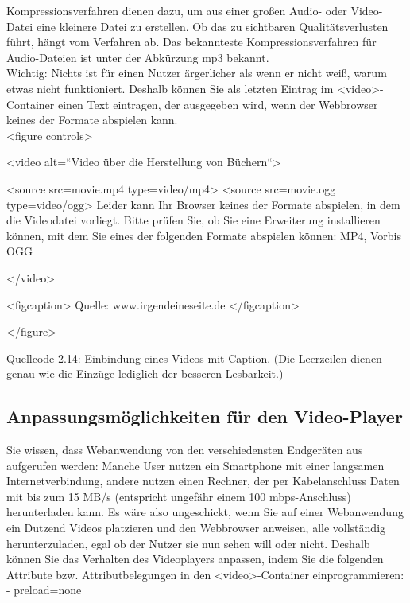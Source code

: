 Kompressionsverfahren dienen dazu, um aus einer großen Audio- oder Video-Datei eine kleinere Datei zu erstellen. Ob das zu sichtbaren Qualitätsverlusten führt, hängt vom Verfahren ab. Das bekannteste Kompressionsverfahren für Audio-Dateien ist unter der Abkürzung mp3 bekannt.\\

Wichtig: Nichts ist für einen Nutzer ärgerlicher als wenn er nicht weiß, warum etwas nicht funktioniert. Deshalb können Sie als letzten Eintrag im <video>-Container einen Text eintragen, der ausgegeben wird, wenn der Webbrowser keines der Formate abspielen kann.\\


<figure controls>

<video alt=“Video über die Herstellung von Büchern“>

<source src=movie.mp4 type=video/mp4>
<source src=movie.ogg type=video/ogg>
Leider kann Ihr Browser keines der Formate abspielen, in dem die Videodatei vorliegt. Bitte prüfen Sie, ob Sie eine Erweiterung installieren können, mit dem Sie eines der folgenden Formate abspielen können: MP4, Vorbis OGG

</video>

<figcaption>
Quelle: www.irgendeineseite.de
</figcaption>

</figure>

Quellcode 2.14: Einbindung eines Videos mit Caption. (Die Leerzeilen dienen genau wie die Einzüge lediglich der besseren Lesbarkeit.)

\subsection{Anpassungsmöglichkeiten für den Video-Player}

Sie wissen, dass Webanwendung von den verschiedensten Endgeräten aus aufgerufen werden: Manche User nutzen ein Smartphone mit einer langsamen Internetverbindung, andere nutzen einen Rechner, der per Kabelanschluss Daten mit bis zum 15 MB/s (entspricht ungefähr einem 100 mbps-Anschluss) herunterladen kann. Es wäre also ungeschickt, wenn Sie auf einer Webanwendung ein Dutzend Videos platzieren und den Webbrowser anweisen, alle vollständig herunterzuladen, egal ob der Nutzer sie nun sehen will oder nicht. Deshalb können Sie das Verhalten des Videoplayers anpassen, indem Sie die folgenden Attribute bzw. Attributbelegungen in den <video>-Container einprogrammieren:\\

-	preload=none

